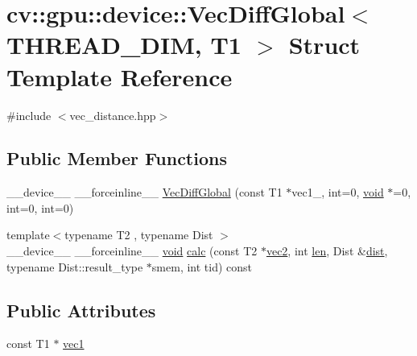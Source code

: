\hypertarget{structcv_1_1gpu_1_1device_1_1VecDiffGlobal}{\section{cv\-:\-:gpu\-:\-:device\-:\-:Vec\-Diff\-Global$<$ T\-H\-R\-E\-A\-D\-\_\-\-D\-I\-M, T1 $>$ Struct Template Reference}
\label{structcv_1_1gpu_1_1device_1_1VecDiffGlobal}
}


{\ttfamily \#include $<$vec\-\_\-distance.\-hpp$>$}

\subsection*{Public Member Functions}
\begin{DoxyCompactItemize}
\item 
\-\_\-\-\_\-device\-\_\-\-\_\- \-\_\-\-\_\-forceinline\-\_\-\-\_\- \hyperlink{structcv_1_1gpu_1_1device_1_1VecDiffGlobal_aba9f0b42d8b5dbeed32915da97cbff7a}{Vec\-Diff\-Global} (const T1 $\ast$vec1\-\_\-, int=0, \hyperlink{legacy_8hpp_a8bb47f092d473522721002c86c13b94e}{void} $\ast$=0, int=0, int=0)
\item 
{\footnotesize template$<$typename T2 , typename Dist $>$ }\\\-\_\-\-\_\-device\-\_\-\-\_\- \-\_\-\-\_\-forceinline\-\_\-\-\_\- \hyperlink{legacy_8hpp_a8bb47f092d473522721002c86c13b94e}{void} \hyperlink{structcv_1_1gpu_1_1device_1_1VecDiffGlobal_a5ff7b9290a3b7ab5fa55955fa6454d01}{calc} (const T2 $\ast$\hyperlink{core__c_8h_aa709adb546262d915d3c98aacf3bb71a}{vec2}, int \hyperlink{core__c_8h_accb79be93f4fbcaa15b5a7670569c9f8}{len}, Dist \&\hyperlink{legacy_8hpp_ae895c2003a87eda49126845b7ac3688e}{dist}, typename Dist\-::result\-\_\-type $\ast$smem, int tid) const 
\end{DoxyCompactItemize}
\subsection*{Public Attributes}
\begin{DoxyCompactItemize}
\item 
const T1 $\ast$ \hyperlink{structcv_1_1gpu_1_1device_1_1VecDiffGlobal_a29d88b3ac8d90cc88a72eb4d922263ec}{vec1}
\end{DoxyCompactItemize}


